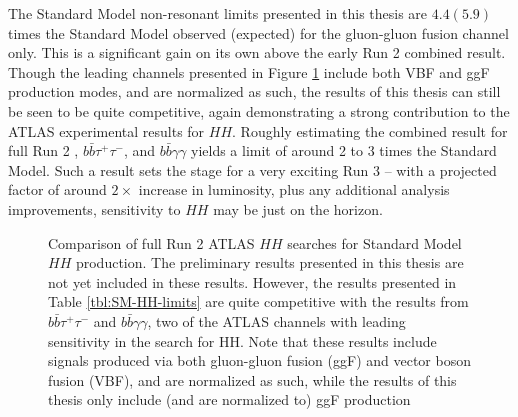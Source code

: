 The Standard Model non-resonant limits presented in this thesis are $4.4(5.9)$ times the Standard Model observed (expected) 
for the gluon-gluon fusion channel only. This is a significant gain on its own above the early Run 2 combined result. 
Though the leading channels presented in Figure \ref{fig:nonres-comparison} include both VBF and ggF production modes, and 
are normalized as such, the \bbbb results of this thesis can still be seen to be quite competitive, again demonstrating a 
strong contribution to the ATLAS experimental results for $HH$. Roughly estimating the combined result for full Run 2 
\bbbb, $b\bar{b}\tau^{+}\tau^{-}$, and $b\bar{b}\gamma\gamma$ yields a limit of around 2 to 3 times the Standard Model. 
Such a result sets the stage for a very exciting Run 3 -- with a projected factor of around $2\times$ increase in 
luminosity, plus any additional analysis improvements, sensitivity to $HH$ may be just on the horizon.
\begin{figure}[ht]
\centering
{}

\caption{\label{fig:nonres-comparison} Comparison of full Run 2 ATLAS $HH$ searches for Standard Model $HH$ production. 
The preliminary results presented in this thesis are not yet included in these results. However, the results presented 
in Table \ref{tbl:SM-HH-limits} are quite competitive with the results from $b\bar{b}\tau^{+}\tau^{-}$ and 
$b\bar{b}\gamma\gamma$, two of the ATLAS channels with leading sensitivity in the search for HH. Note that these 
results include signals produced via both gluon-gluon fusion (ggF) and vector boson fusion (VBF), and are normalized as 
such, while the results of this thesis only include (and are normalized to) ggF production ~\cite{ATL-PHYS-PUB-2021-031}}
\end{figure}